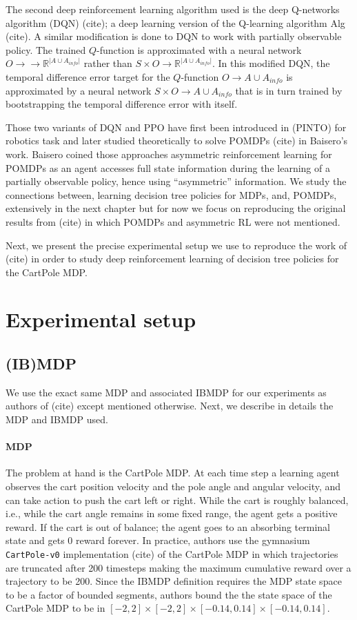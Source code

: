 The second deep reinforcement learning algorithm used is the deep Q-networks algorithm (DQN) (cite); a deep learning version of the Q-learning algorithm Alg (cite).
A similar modification is done to DQN to work with partially observable policy. The trained $Q$-function is approximated with a neural network $O\rightarrow \rightarrow \mathbb{R}^{|A\cup A_{info}|}$ rather than $S\times O\rightarrow \mathbb{R}^{|A\cup A_{info}|}$.
In this modified DQN, the temporal difference error target for the $Q$-function $O\rightarrow A\cup A_{info}$ is approximated by a neural network $S\times O\rightarrow A\cup A_{info}$ that is in turn trained by bootstrapping the temporal difference error with itself.

Those two variants of DQN and PPO have first been introduced in (PINTO) for robotics task and later studied theoretically to solve POMDPs (cite) in Baisero's work.
Baisero coined those approaches asymmetric reinforcement learning for POMDPs as an agent accesses full state information during the learning of a partially observable policy, hence using ``asymmetric'' information.
We study the connections between, learning decision tree policies for MDPs, and, POMDPs, extensively in the next chapter but for now we focus on reproducing the original results from (cite) in which POMDPs and asymmetric RL were not mentioned. 

Next, we present the precise experimental setup we use to reproduce the work of (cite) in order to study deep reinforcement learning of decision tree policies for the CartPole MDP.

\section{Experimental setup}
\subsection{(IB)MDP} 

We use the exact same MDP and associated IBMDP for our experiments as authors of (cite) except mentioned otherwise. Next, we describe in details the MDP and IBMDP used.

\paragraph{MDP} The problem at hand is the CartPole MDP. At each time step a learning agent observes the cart position velocity and the pole angle and angular velocity, and can take action to push the cart left or right. While the cart is roughly balanced, i.e., while the cart angle remains in some fixed range, the agent gets a positive reward.
If the cart is out of balance; the agent goes to an absorbing terminal state and gets 0 reward forever.
In practice, authors use the gymnasium \texttt{CartPole-v0} implementation (cite) of the CartPole MDP in which trajectories are truncated after 200 timesteps making the maximum cumulative reward over a trajectory to be 200.
Since the IBMDP definition requires the MDP state space to be a factor of bounded segments, authors bound the the state space of the CartPole MDP to be in $[-2, 2] \times [-2, 2] \times [-0.14, 0.14] \times [-0.14, 0.14]$.

